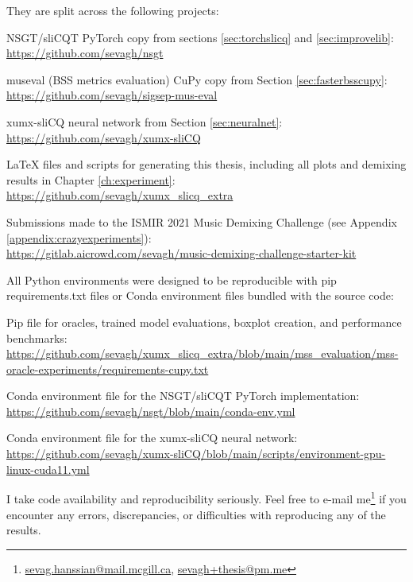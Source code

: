 \documentclass[report.tex]{subfiles}
\begin{document}
\begin{appendices}
They are split across the following projects:
\begin{tight_itemize}
	\item
		NSGT/sliCQT PyTorch copy from sections \ref{sec:torchslicq} and \ref{sec:improvelib}:\\
		\url{https://github.com/sevagh/nsgt}
	\item
		museval (BSS metrics evaluation) CuPy copy from Section \ref{sec:fasterbsscupy}:\\
		\url{https://github.com/sevagh/sigsep-mus-eval}
	\item
		xumx-sliCQ neural network from Section \ref{sec:neuralnet}:\\
		\url{https://github.com/sevagh/xumx-sliCQ}
	\item
		LaTeX files and scripts for generating this thesis, including all plots and demixing results in Chapter \ref{ch:experiment}:\\
		\url{https://github.com/sevagh/xumx_slicq_extra}
	\item
		Submissions made to the ISMIR 2021 Music Demixing Challenge (see Appendix \ref{appendix:crazyexperiments}):\\
		\url{https://gitlab.aicrowd.com/sevagh/music-demixing-challenge-starter-kit}
\end{tight_itemize}

All Python environments were designed to be reproducible with pip requirements.txt files or Conda environment files bundled with the source code:

\begin{tight_itemize}
	\item
		Pip file for oracles, trained model evaluations, boxplot creation, and performance benchmarks: \url{https://github.com/sevagh/xumx_slicq_extra/blob/main/mss_evaluation/mss-oracle-experiments/requirements-cupy.txt}
	\item
		Conda environment file for the NSGT/sliCQT PyTorch implementation:\\
		\url{https://github.com/sevagh/nsgt/blob/main/conda-env.yml}
	\item
		Conda environment file for the xumx-sliCQ neural network: \url{https://github.com/sevagh/xumx-sliCQ/blob/main/scripts/environment-gpu-linux-cuda11.yml}
\end{tight_itemize}

I take code availability and reproducibility seriously. Feel free to e-mail me\footnote{\href{mailto:sevag.hanssian@mail.mcgill.ca}{sevag.hanssian@mail.mcgill.ca}, \href{mailto:sevagh+thesis@pm.me}{sevagh+thesis@pm.me}} if you encounter any errors, discrepancies, or difficulties with reproducing any of the results.


\end{appendices}
\end{document}
